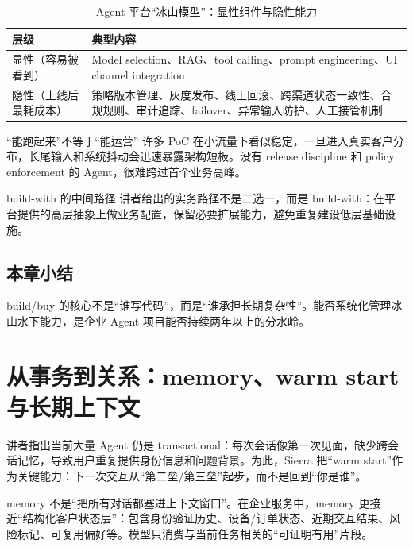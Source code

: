 \documentclass[a4paper]{article}
\begin{document}
\begin{table}[H]
\centering
\caption{Agent 平台“冰山模型”：显性组件与隐性能力}
\begin{tabularx}{\textwidth}{>{\raggedright\arraybackslash}p{3.4cm} >{\raggedright\arraybackslash}X}
\toprule
层级 & 典型内容 \\
\midrule
显性（容易被看到） & Model selection、RAG、tool calling、prompt engineering、UI channel integration \\
隐性（上线后最耗成本） & 策略版本管理、灰度发布、线上回滚、跨渠道状态一致性、合规规则、审计追踪、failover、异常输入防护、人工接管机制 \\
\bottomrule
\end{tabularx}
\end{table}

\begin{warningbox}{“能跑起来”不等于“能运营”}
许多 PoC 在小流量下看似稳定，一旦进入真实客户分布，长尾输入和系统抖动会迅速暴露架构短板。没有 release discipline 和 policy enforcement 的 Agent，很难跨过首个业务高峰。
\end{warningbox}

\begin{importantbox}{build-with 的中间路径}
讲者给出的实务路径不是二选一，而是 build-with：在平台提供的高层抽象上做业务配置，保留必要扩展能力，避免重复建设低层基础设施。
\end{importantbox}

\subsection{本章小结}

build/buy 的核心不是“谁写代码”，而是“谁承担长期复杂性”。能否系统化管理冰山水下能力，是企业 Agent 项目能否持续两年以上的分水岭。

\section{从事务到关系：memory、warm start 与长期上下文}

讲者指出当前大量 Agent 仍是 transactional：每次会话像第一次见面，缺少跨会话记忆，导致用户重复提供身份信息和问题背景。为此，Sierra 把“warm start”作为关键能力：下一次交互从“第二垒/第三垒”起步，而不是回到“你是谁”。

memory 不是“把所有对话都塞进上下文窗口”。在企业服务中，memory 更接近“结构化客户状态层”：包含身份验证历史、设备/订单状态、近期交互结果、风险标记、可复用偏好等。模型只消费与当前任务相关的“可证明有用”片段。
\end{document}
